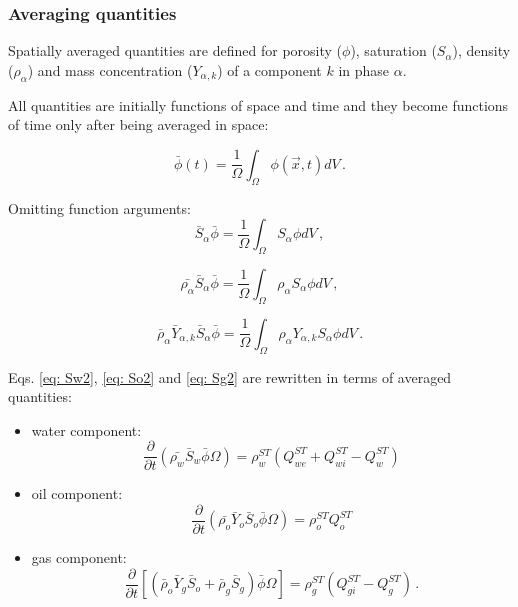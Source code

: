 \documentclass[authoryear,preprint,review,11pt]{elsarticle}
\begin{document}
\subsubsection{Averaging quantities}

Spatially averaged quantities are defined for porosity ($\phi$), saturation ($S_\alpha$), density ($\rho_\alpha$) and mass concentration ($Y_{\alpha,k}$) of a component $k$ in phase $\alpha$.

All quantities are initially functions of space and time and they become functions of time only after being averaged in space:

\begin{equation}
\bar{\phi} (t) = \frac{1}{\Omega}\int_{\Omega}\phi \left(\vec{x},t\right) dV \, .
\end{equation}

Omitting function arguments:
\begin{equation}
\bar{S}_\alpha\bar{\phi} = \frac{1}{\Omega}\int_{\Omega}S_\alpha \phi dV \, ,
\end{equation}

\begin{equation}
\bar{\rho_\alpha}\bar{S}_\alpha \bar{\phi} = \frac{1}{\Omega}\int_{\Omega}\rho_\alpha S_\alpha \phi dV \, ,
\end{equation}

\begin{equation}
\bar{\rho}_\alpha \bar{Y}_{\alpha,k}\bar{S}_\alpha \bar{\phi} = \frac{1}{\Omega}\int_{\Omega}\rho_\alpha Y_{\alpha,k} S_\alpha \phi dV \, .
\end{equation}

Eqs. \eqref{eq: Sw2}, \eqref{eq: So2} and \eqref{eq: Sg2} are rewritten in terms of averaged quantities:

\begin{itemize}
\item water component:
\begin{equation}\label{eq: Sw3}
\frac{\partial}{\partial t} \left( \bar{\rho_w}\bar{S}_w\bar{\phi} \Omega \right) = \rho_w^{ST}\left(Q_{we}^{ST} + Q_{wi}^{ST}-Q_w^{ST}\right)
\end{equation}

\item oil component:
\begin{equation}\label{eq: So3}
\frac{\partial}{\partial t} \left( \bar{\rho_o}\bar{Y}_o\bar{S}_o\bar{\phi} \Omega \right) = \rho_o^{ST}Q_o^{ST}
\end{equation}

\item gas component:
\begin{equation}\label{eq: Sg3}
\frac{\partial}{\partial t} \left[\left( \bar{\rho}_o\bar{Y}_g \bar{S}_o + \bar{\rho}_g \bar{S}_g \right) \bar{\phi} \Omega\right] =  \rho_g^{ST}(Q_{gi}^{ST}-Q_g^{ST}) \, .
\end{equation}
\end{itemize}
\end{document}
